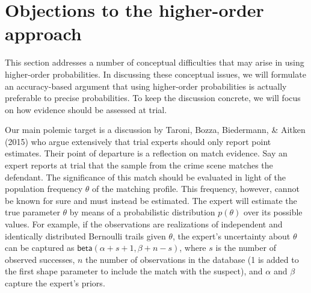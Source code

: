\documentclass[
  10pt,
  dvipsnames,enabledeprecatedfontcommands]{scrartcl}
\newcommand{\s}[1]{\mbox{$\mathsf{#1}$}}
\begin{document}
\pagebreak

\hypertarget{objections-to-the-higher-order-approach}{%
\section{Objections to the higher-order
approach}\label{objections-to-the-higher-order-approach}}

This section addresses a number of conceptual difficulties that may
arise in using higher-order probabilities. In discussing these
conceptual issues, we will formulate an accuracy-based argument that
using higher-order probabilities is actually preferable to precise
probabilities. To keep the discussion concrete, we will focus on how
evidence should be assessed at trial.

Our main polemic target is a discussion by Taroni, Bozza, Biedermann, \&
Aitken (2015) who argue extensively that trial experts should only
report point estimates. Their point of departure is a reflection on
match evidence. Say an expert reports at trial that the sample from the
crime scene matches the defendant. The significance of this match should
be evaluated in light of the population frequency \(\theta\) of the
matching profile. This frequency, however, cannot be known for sure and
must instead be estimated. The expert will estimate the true parameter
\(\theta\) by means of a probabilistic distribution \(p(\theta)\) over
its possible values. For example, if the observations are realizations
of independent and identically distributed Bernoulli trails given
\(\theta\), the expert's uncertainty about \(\theta\) can be captured as
\(\s{beta}(\alpha + s + 1 ,\beta + n - s)\), where \(s\) is the number
of observed successes, \(n\) the number of observations in the database
(1 is added to the first shape parameter to include the match with the
suspect), and \(\alpha\) and \(\beta\) capture the expert's priors.
\end{document}
